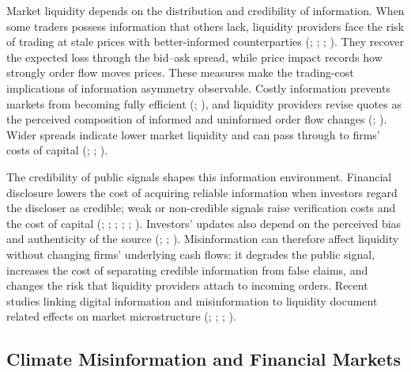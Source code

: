 \documentclass{article}
\theoremstyle{plain}
\begin{document}
Market liquidity depends on the distribution and credibility of information. When some traders possess information that others lack, liquidity providers face the risk of trading at stale prices with better-informed counterparties (\cite{Akerlof1970}; \cite{GlostenMilgrom1985}; \cite{EasleyOHara1992}; \cite{Kyle1985}). They recover the expected loss through the bid--ask spread, while price impact records how strongly order flow moves prices. These measures make the trading-cost implications of information asymmetry observable. Costly information prevents markets from becoming fully efficient (\cite{GrossmanStiglitz1980}; \cite{Stiglitz2000}), and liquidity providers revise quotes as the perceived composition of informed and uninformed order flow changes (\cite{Hasbrouck1991}; \cite{easley1996}). Wider spreads indicate lower market liquidity and can pass through to firms' costs of capital (\cite{Tse2024}; \cite{Aliyev2025}; \cite{Aquilina2025}).

The credibility of public signals shapes this information environment. Financial disclosure lowers the cost of acquiring reliable information when investors regard the discloser as credible; weak or non-credible signals raise verification costs and the cost of capital (\cite{DiamondVerrecchia1991}; \cite{Verrecchia2001}; \cite{healy2001information}; \cite{LeuzVerrecchia2000}; \cite{BushmanSmith2001}; \cite{GoldsteinYang2017}). Investors' updates also depend on the perceived bias and authenticity of the source (\cite{Dye1985}; \cite{Cologna2022ValueJudgements}; \cite{KorehMandelkern2024}). Misinformation can therefore affect liquidity without changing firms' underlying cash flows: it degrades the public signal, increases the cost of separating credible information from false claims, and changes the risk that liquidity providers attach to incoming orders. Recent studies linking digital information and misinformation to liquidity document related effects on market microstructure (\cite{HerzingMuck2025}; \cite{DeesOzyurtMiller2026}; \cite{Mo2026ClimateRiskDisclosureMispricing}; \cite{LEIPPOLD202264}).

\subsection{Climate Misinformation and Financial Markets}
\end{document}
